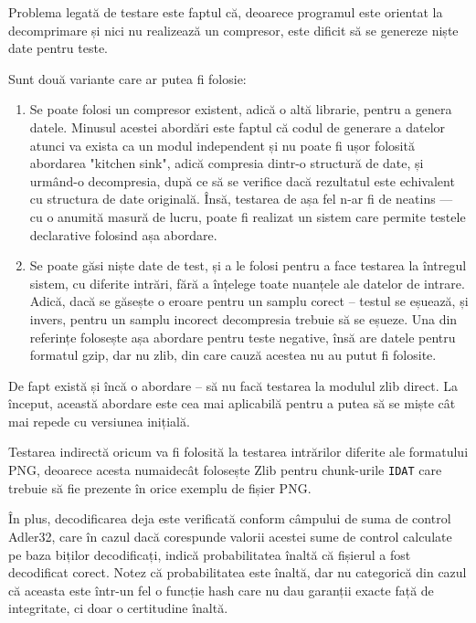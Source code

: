 \documentclass[a4paper,12pt]{report}
\begin{document}
Problema legată de testare este faptul că, deoarece programul este orientat
la decomprimare și nici nu realizează un compresor,
este dificit să se genereze niște date pentru teste.

Sunt două variante care ar putea fi folosie:
\begin{enumerate}
    \item
        Se poate folosi un compresor existent, adică o altă librarie, pentru a genera datele.
        Minusul acestei abordări este faptul că codul de generare a datelor atunci va exista
        ca un modul independent și nu poate fi ușor folosită abordarea "kitchen sink", adică
        compresia dintr-o structură de date, și urmând-o decompresia, după ce să se verifice
        dacă rezultatul este echivalent cu structura de date originală.
        Însă, testarea de așa fel n-ar fi de neatins --- cu o anumită masură de lucru,
        poate fi realizat un sistem care permite testele declarative folosind așa abordare.
    \item
        Se poate găsi niște date de test, și a le folosi pentru a face testarea
        la întregul sistem, cu diferite intrări, fără a înțelege toate nuanțele ale datelor de intrare.
        Adică, dacă se găsește o eroare pentru un samplu corect -- testul se eșuează,
        și invers, pentru un samplu incorect decompresia trebuie să se eșueze.
        Una din referințe \cite{gzip_impl} folosește așa abordare pentru teste negative,
        însă are datele pentru formatul gzip, dar nu zlib, din care cauză acestea nu au putut fi folosite.
\end{enumerate}

De fapt există și încă o abordare -- să nu facă testarea la modulul zlib direct.
La început, această abordare este cea mai aplicabilă pentru a putea să se miște cât mai repede cu versiunea inițială.

Testarea indirectă oricum va fi folosită la testarea intrărilor diferite ale formatului \ac{PNG},
deoarece acesta numaidecât folosește Zlib pentru chunk-urile \texttt{IDAT} care trebuie să fie prezente
în orice exemplu de fișier \ac{PNG}.

În plus, decodificarea deja este verificată conform câmpului de suma de control Adler32,
care în cazul dacă corespunde valorii acestei sume de control calculate pe baza biților decodificați,
indică probabilitatea înaltă că fișierul a fost decodificat corect. 
Notez că probabilitatea este înaltă, dar nu categorică din cazul că aceasta este într-un fel o funcție hash
care nu dau garanții exacte față de integritate, ci doar o certitudine înaltă.
\end{document}

